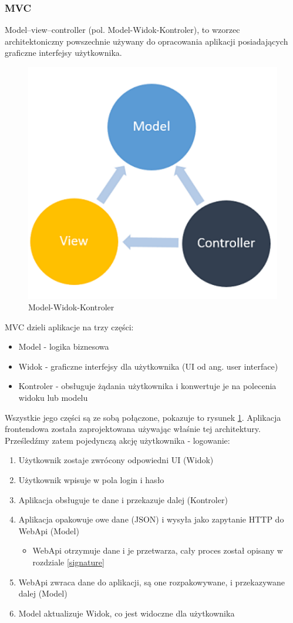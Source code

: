 \documentclass[12pt]{article}
\numberwithin{figure}{section}
\begin{document}
\begin{sloppypar}
\subsubsection{MVC}
Model–view–controller (pol. Model-Widok-Kontroler), to wzorzec architektoniczny powszechnie używany do opracowania aplikacji posiadających graficzne interfejsy użytkownika. 

\begin{figure}[H] 
    \centering
    \includegraphics[width=.5\textwidth]{images/chapter_3/mvc.png}
    \caption{ Model-Widok-Kontroler \cite{mvc}}
    \label{fig:mvc}
\end{figure}
    
MVC dzieli aplikacje na trzy części:
\begin{itemize}
    \item Model - logika biznesowa
    \item Widok - graficzne interfejsy dla użytkownika (UI od ang. user interface) 
    \item Kontroler - obsługuje żądania użytkownika i konwertuje je na polecenia widoku lub modelu
\end{itemize}
    
Wszystkie jego części są ze sobą połączone, pokazuje to rysunek \ref{fig:mvc}.
Aplikacja frontendowa została zaprojektowana używając właśnie tej architektury. 
Prześledźmy zatem pojedynczą akcję użytkownika - logowanie:
\begin{enumerate}
    \item Użytkownik zostaje zwrócony odpowiedni UI (Widok)
    \item Użytkownik wpisuje w pola login i hasło 
    \item Aplikacja obsługuje te dane i przekazuje dalej (Kontroler)
    \item Aplikacja opakowuje owe dane (JSON) i wysyła jako zapytanie HTTP do WebApi (Model)
        \begin{itemize}
            \item WebApi otrzymuje dane i je przetwarza, cały proces został opisany w rozdziale \ref{signature}
        \end{itemize}
    \item WebApi zwraca dane do aplikacji, są one rozpakowywane, i przekazywane dalej (Model)
    \item Model aktualizuje Widok, co jest widoczne dla użytkownika
\end{enumerate}
    

\end{sloppypar}
\end{document}
